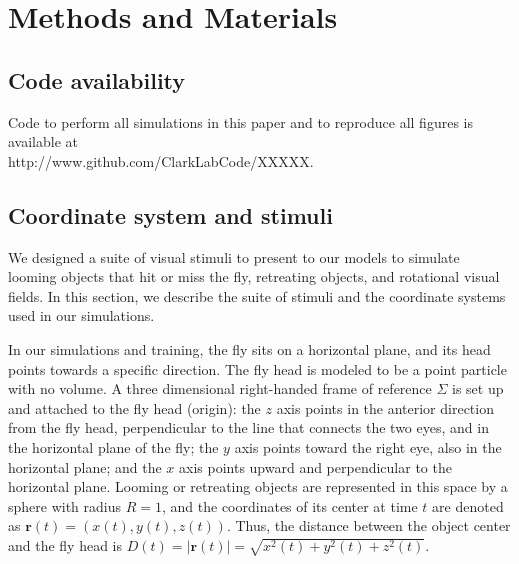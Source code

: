 \documentclass[pdftex,9pt,lineno]{elife}
\begin{document}








\newpage


\section{Methods and Materials}

\subsection{Code availability}
Code to perform all simulations in this paper and to reproduce all figures is available at \\ http://www.github.com/ClarkLabCode/XXXXX.

\subsection{Coordinate system and stimuli}
We designed a suite of visual stimuli to present to our models to simulate looming objects that hit or miss the fly, retreating objects, and rotational visual fields. In this section, we describe the suite of stimuli and the coordinate systems used in our simulations.

In our simulations and training, the fly sits on a horizontal plane, and its head points towards a specific direction. The fly head is modeled to be a point particle with no volume. A three dimensional right-handed frame of reference $\Sigma$ is set up and attached to the fly head (origin): the $z$ axis points in the anterior direction from the fly head, perpendicular to the line that connects the two eyes, and in the horizontal plane of the fly; the $y$ axis points toward the right eye, also in the horizontal plane; and the $x$ axis points upward and perpendicular to the horizontal plane. Looming or retreating objects are represented in this space by a sphere with radius $R=1$, and the coordinates of its center at time $t$ are denoted as $\mathbf{r}(t) = (x(t),y(t),z(t))$. Thus, the distance between the object center and the fly head is $D(t) = |\mathbf{r}(t)| = \sqrt{x^{2}(t)+y^{2}(t)+z^{2}(t)}$.
\end{document}
